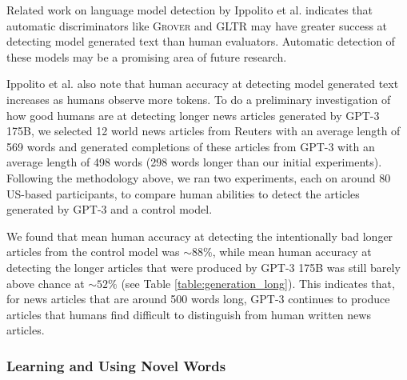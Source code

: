 Related work on language model detection by Ippolito et al. \cite{ippolito2019automatic} indicates that automatic discriminators like \textsc{Grover} \cite{zellers2019defending} and GLTR \cite{gehrmann2019gltr} may have greater success at detecting model generated text than human evaluators. Automatic detection of these models may be a promising area of future research.

Ippolito et al. \cite{ippolito2019automatic} also note that human accuracy at detecting model generated text increases as humans observe more tokens. To do a preliminary investigation of how good humans are at detecting longer news articles generated by GPT-3 175B, we selected 12 world news articles from Reuters with an average length of 569 words and generated completions of these articles from GPT-3 with an average length of 498 words (298 words longer than our initial experiments). Following the methodology above, we ran two experiments, each on around 80 US-based participants, to compare human abilities to detect the articles generated by GPT-3 and a control model.

 We found that mean human accuracy at detecting the intentionally bad longer articles from the control model was $\sim88\%$, while mean human accuracy at detecting the longer articles that were produced by GPT-3 175B was still barely above chance at $\sim52\%$ (see Table \ref{table:generation_long}). This indicates that, for news articles that are around 500 words long, GPT-3 continues to produce articles that humans find difficult to distinguish from human written news articles.

        \subsubsection{Learning and Using Novel Words}
        \label{section:Learning_and_Using_Novel_Words}

